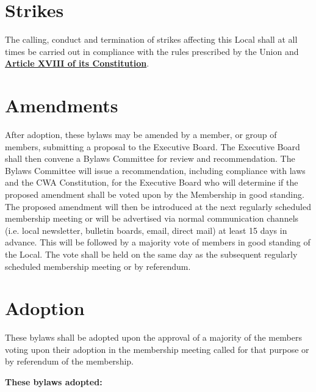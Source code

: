 \documentclass[11pt]{article}
\let\oldhref\href
\renewcommand{\href}[2]{\oldhref{#1}{\bfseries#2}}
\newcommand{\article}[1]{\vspace{.75cm}\section{#1}}
\begin{document}
\article{Strikes}
The calling, conduct and termination of strikes affecting this Local shall at all times be carried out in compliance with the rules prescribed by the Union and \href{https://cwa-union.org/for-locals/cwa-constitution\#A18}{Article XVIII of its Constitution}.

\article{Amendments}\label{amendments}
After adoption, these bylaws may be amended by a member, or group of members, submitting a proposal to the Executive Board. The Executive Board shall then convene a Bylaws Committee for review and recommendation. The Bylaws Committee will issue a recommendation, including compliance with laws and the CWA Constitution, for the Executive Board who will determine if the proposed amendment shall be voted upon by the Membership in good standing. The proposed amendment will then be introduced at the next regularly scheduled membership meeting or will be advertised via normal communication channels (i.e. local newsletter, bulletin boards, email, direct mail) at least 15 days in advance. This will be followed by a majority vote of members in good standing of the Local. The vote shall be held on the same day as the subsequent regularly scheduled membership meeting or by referendum.

\article{Adoption}
These bylaws shall be adopted upon the approval of a majority of the members voting upon their adoption in the membership meeting called for that purpose or by referendum of the membership.

\vspace{1cm}
\large{\textbf{These bylaws adopted:} \date{September 19, 2022}}
\end{document}
